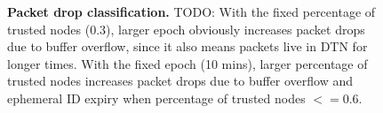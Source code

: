\documentclass[11pt]{article}
\begin{document}
\begin{figure}[h!]
{\label{fig:drop_classification_percentage_1}
}
\caption{{\bf Packet drop classification.}
TODO: With the fixed percentage of trusted nodes (0.3), larger epoch obviously increases packet drops due to buffer overflow, since it also means packets live in DTN for longer times.
With the fixed epoch (10 mins), larger percentage of trusted nodes increases packet drops due to buffer overflow and ephemeral ID expiry when percentage of trusted nodes $<=0.6$.
}
\label{fig:drop_classification}
\end{figure}
\end{document}
